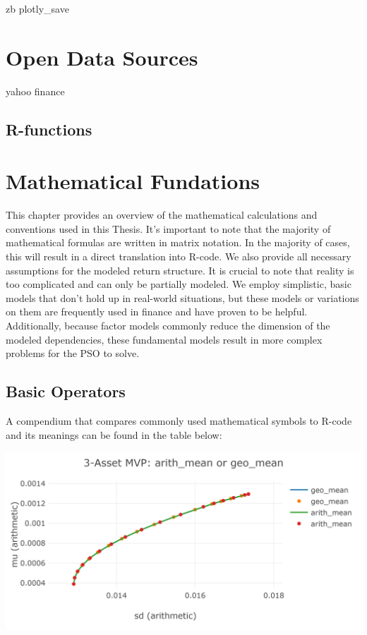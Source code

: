 \documentclass[
  oneside]{book}
\begin{document}
zb plotly\_save

\hypertarget{open-data-sources}{%
\chapter{Open Data Sources}\label{open-data-sources}}

yahoo finance

\hypertarget{r-functions-1}{%
\section{R-functions}\label{r-functions-1}}

\hypertarget{mathematical-fundations}{%
\chapter{Mathematical Fundations}\label{mathematical-fundations}}

This chapter provides an overview of the mathematical calculations and conventions used in this Thesis. It's important to note that the majority of mathematical formulas are written in matrix notation. In the majority of cases, this will result in a direct translation into R-code. We also provide all necessary assumptions for the modeled return structure. It is crucial to note that reality is too complicated and can only be partially modeled. We employ simplistic, basic models that don't hold up in real-world situations, but these models or variations on them are frequently used in finance and have proven to be helpful. Additionally, because factor models commonly reduce the dimension of the modeled dependencies, these fundamental models result in more complex problems for the PSO to solve.

\hypertarget{basic-operators}{%
\section{Basic Operators}\label{basic-operators}}

A compendium that compares commonly used mathematical symbols to R-code and its meanings can be found in the table below:

\includegraphics{Master_Thesis_files/figure-latex/unnamed-chunk-4-1.png}
\end{document}
